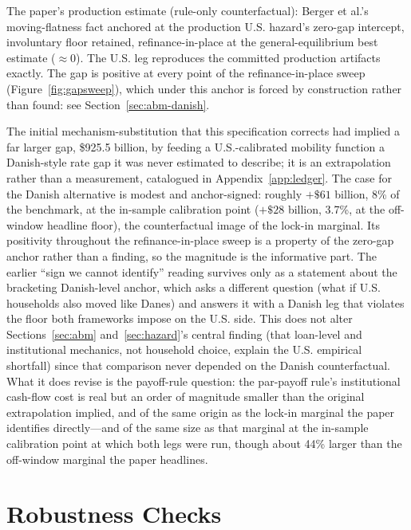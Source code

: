 \documentclass[12pt]{article}
\begin{document}
\begin{table}[H]
\begin{threeparttable}
\begin{tablenotes}[flushleft]
\item[d] The paper's production estimate (rule-only counterfactual): Berger et al.'s moving-flatness fact anchored at the production U.S. hazard's zero-gap intercept, involuntary floor retained, refinance-in-place at the general-equilibrium best estimate ($\approx$0). The U.S. leg reproduces the committed production artifacts exactly. The gap is positive at every point of the refinance-in-place sweep (Figure~\ref{fig:gapsweep}), which under this anchor is forced by construction rather than found: see Section~\ref{sec:abm-danish}.
\end{tablenotes}
\end{threeparttable}
\end{table}

The initial mechanism-substitution that this specification corrects had implied a far larger gap, \$925.5 billion, by feeding a U.S.-calibrated mobility function a Danish-style rate gap it was never estimated to describe; it is an extrapolation rather than a measurement, catalogued in Appendix~\ref{app:ledger}. The case for the Danish alternative is modest and anchor-signed: roughly $+\$61$ billion, 8\% of the benchmark, at the in-sample calibration point ($+\$28$ billion, 3.7\%, at the off-window headline floor), the counterfactual image of the lock-in marginal. Its positivity throughout the refinance-in-place sweep is a property of the zero-gap anchor rather than a finding, so the magnitude is the informative part. The earlier ``sign we cannot identify'' reading survives only as a statement about the bracketing Danish-level anchor, which asks a different question (what if U.S. households also moved like Danes) and answers it with a Danish leg that violates the floor both frameworks impose on the U.S. side. This does not alter Sections~\ref{sec:abm} and~\ref{sec:hazard}'s central finding (that loan-level and institutional mechanics, not household choice, explain the U.S. empirical shortfall) since that comparison never depended on the Danish counterfactual. What it does revise is the payoff-rule question: the par-payoff rule's institutional cash-flow cost is real but an order of magnitude smaller than the original extrapolation implied, and of the same origin as the lock-in marginal the paper identifies directly---and of the same size as that marginal at the in-sample calibration point at which both legs were run, though about 44\% larger than the off-window marginal the paper headlines.

\section{Robustness Checks}\label{sec:robustness}
\end{document}
